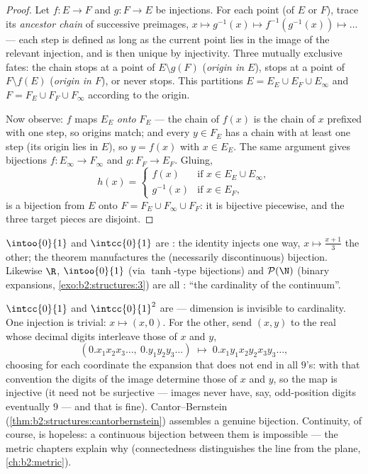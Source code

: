 \begin{proof}
Let $f \colon E \to F$ and $g \colon F \to E$ be injections. For
each point (of $E$ or $F$), trace its \emph{ancestor chain} of
successive preimages, $x \mapsto g^{-1}(x) \mapsto
f^{-1}(g^{-1}(x)) \mapsto \dots$ --- each step is defined as long as
the current point lies in the image of the relevant injection, and
is then unique by injectivity. Three mutually exclusive fates:
the chain stops at a point of $E \setminus g(F)$ (\emph{origin in
$E$}), stops at a point of $F \setminus f(E)$ (\emph{origin in
$F$}), or never stops. This partitions $E = E_E \cup E_F \cup
E_\infty$ and $F = F_E \cup F_F \cup F_\infty$ according to the
origin.

Now observe: $f$ maps $E_E$ \emph{onto} $F_E$ --- the chain of
$f(x)$ is the chain of $x$ prefixed with one step, so origins match;
and every $y \in F_E$ has a chain with at least one step (its origin
lies in $E$), so $y = f(x)$ with $x \in E_E$. The same argument
gives bijections $f \colon E_\infty \to F_\infty$ and $g \colon F_F
\to E_F$. Gluing,
\[
h(x) =
\begin{cases}
f(x) & \text{if } x \in E_E \cup E_\infty,\\
g^{-1}(x) & \text{if } x \in E_F,
\end{cases}
\]
is a bijection from $E$ onto $F = F_E \cup F_\infty \cup F_F$: it is
bijective piecewise, and the three target pieces are disjoint.
\end{proof}

\begin{example}\label{ex:b2:structures:cbexample}
$\intoo{0}{1}$ and $\intcc{0}{1}$ are : the identity
injects one way, $x \mapsto \frac{x + 1}{3}$ the other; the theorem
manufactures the (necessarily discontinuous) bijection. Likewise
$\R$, $\intoo{0}{1}$ (via $\tanh$-type bijections) and
$\mathcal{P}(\N)$ (binary expansions, \cref{exo:b2:structures:3})
are all : ``the cardinality of the continuum''.
\end{example}

\begin{example}\label{ex:b2:structures:squareseg}
$\intcc{0}{1}$ and $\intcc{0}{1}^2$ are  --- dimension
is invisible to cardinality. One injection is trivial: $x
\mapsto (x, 0)$. For the other, send $(x, y)$ to the real whose
decimal digits interleave those of $x$ and $y$,
\[
(0.x_1x_2x_3\dots,\ 0.y_1y_2y_3\dots)
\;\longmapsto\; 0.x_1y_1x_2y_2x_3y_3\dots,
\]
choosing for each coordinate the expansion that does not end in
all $9$'s: with that convention the digits of the image
determine those of $x$ and $y$, so the map is injective (it need
not be surjective --- images never have, say, odd-position
digits eventually $9$ --- and that is fine).
Cantor--Bernstein (\cref{thm:b2:structures:cantorbernstein})
assembles a genuine bijection. Continuity, of course, is
hopeless: a continuous bijection between them is impossible ---
the metric chapters explain why (connectedness distinguishes
the line from the plane, \cref{ch:b2:metric}).
\end{example}

